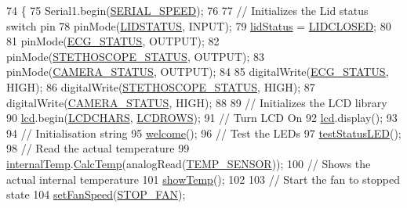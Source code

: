 \begin{DoxyCode}
74              \{
75   Serial1.begin(\hyperlink{_globals_8h_a4081bc1d938e0d9b2b0941e3a1143498}{SERIAL\_SPEED});
76 
77   \textcolor{comment}{// Initializes the Lid status switch pin}
78   pinMode(\hyperlink{_globals_8h_a9d1e04090b98f20c171c70e566a32e16}{LIDSTATUS}, INPUT);
79   \hyperlink{_meditech___chip_kit_control_panel_8pde_adea51712174a5f82a31231a67e0d4608}{lidStatus} = \hyperlink{_globals_8h_af04a3919dc1fa7d521c9514be995b43d}{LIDCLOSED};
80   
81   pinMode(\hyperlink{_globals_8h_a81c971d1ee27ca31e310c80ef260b390}{ECG\_STATUS}, OUTPUT);
82   pinMode(\hyperlink{_globals_8h_a8519a074bf27b6dcc876ce549b2f5ea7}{STETHOSCOPE\_STATUS}, OUTPUT);
83   pinMode(\hyperlink{_globals_8h_ad0154ccab9906702a495f07dfedd0136}{CAMERA\_STATUS}, OUTPUT);
84 
85   digitalWrite(\hyperlink{_globals_8h_a81c971d1ee27ca31e310c80ef260b390}{ECG\_STATUS}, HIGH);
86   digitalWrite(\hyperlink{_globals_8h_a8519a074bf27b6dcc876ce549b2f5ea7}{STETHOSCOPE\_STATUS}, HIGH);
87   digitalWrite(\hyperlink{_globals_8h_ad0154ccab9906702a495f07dfedd0136}{CAMERA\_STATUS}, HIGH);
88 
89   \textcolor{comment}{// Initializes the LCD library}
90   \hyperlink{_meditech___chip_kit_control_panel_8pde_ae0b100905fb0ed88dddaafda0aa05379}{lcd}.begin(\hyperlink{_l_c_d_8h_acea744bc7db589514d98dde1a19a4be6}{LCDCHARS}, \hyperlink{_l_c_d_8h_a1b8861bc5ab0412d754e0bd902c73bcf}{LCDROWS});
91   \textcolor{comment}{// Turn LCD On}
92   \hyperlink{_meditech___chip_kit_control_panel_8pde_ae0b100905fb0ed88dddaafda0aa05379}{lcd}.display();
93 
94   \textcolor{comment}{// Initialisation string}
95   \hyperlink{_meditech___chip_kit_control_panel_8pde_a236e454e493fc9b262f746305660a2eb}{welcome}();
96   \textcolor{comment}{// Test the LEDs}
97   \hyperlink{_meditech___chip_kit_control_panel_8pde_af1a6bbf84a5ea76623bdc49aaf642a28}{testStatusLED}();
98   \textcolor{comment}{// Read the actual temperature}
99   \hyperlink{_meditech___chip_kit_control_panel_8pde_adcfca3504612462229db71750def77f9}{internalTemp}.\hyperlink{class_temperature_a909c328fd6235d0e7c8ea110a1fb201d}{CalcTemp}(analogRead(\hyperlink{_temperature_8h_a16433c75f0d3615fe60d59ec8a86834a}{TEMP\_SENSOR}));
100   \textcolor{comment}{// Shows the actual internal temperature}
101   \hyperlink{_meditech___chip_kit_control_panel_8pde_a89c0a8283a410b693ebef39173a8f493}{showTemp}();
102   
103   \textcolor{comment}{// Start the fan to stopped state}
104   \hyperlink{_meditech___chip_kit_control_panel_8pde_ac0f1975168c58bd48fc29f8e3004a5a8}{setFanSpeed}(\hyperlink{_globals_8h_a1c75f833b458a1118ffc6e8ff1086bd8}{STOP\_FAN});

\end{DoxyCode}
